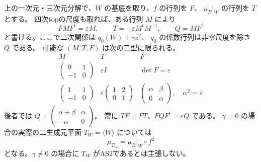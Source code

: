 \begin{proposition}[共通二平面上の中山作用の二標準形]
\label{prop:h3-order2-plane-matrices}
上の一次元・三次元分解で、$W$ の基底を取り、$f$ の行列を $F$、
$\mu_B|_W$ の行列を $T$ とする。
四次topの尺度も取れば、ある行列 $M$ により
\[
 FMF^t=\varepsilon M,\qquad
 T=-\varepsilon M^tM^{-1},\qquad
 Q=MF^t
\]
と書ける。ここで二次関係は $q_0(W)+\gamma z^2$、
$q_0$ の係数行列は非零尺度を除き $Q$ である。
可能な $(M,T,F)$ は次の二型に限られる。
\[
\begin{array}{c|c|c}
M&T&F\\\hline
\begin{pmatrix}0&1\\-1&0\end{pmatrix}
 &\varepsilon I&\det F=\varepsilon\\[2pt]
\begin{pmatrix}1&1\\-1&0\end{pmatrix}
 &\varepsilon\begin{pmatrix}1&2\\0&1\end{pmatrix}
 &\begin{pmatrix}\alpha&\beta\\0&\alpha\end{pmatrix},\quad
   \alpha^2=\varepsilon
\end{array}
\]
後者では $Q=\begin{pmatrix}\alpha+\beta&\alpha\\-\alpha&0\end{pmatrix}$。
常に $TF=FT$、$FQF^t=\varepsilon Q$ である。
$\gamma=0$ の場合の実際の二生成元平面 $T_W=\langle W\rangle$ については
\[
 \mu_{T_W}=\mu_B|_W\circ f^2
\]
となる。$\gamma\ne0$ の場合に $T_W$ がAS2であるとは主張しない。
\end{proposition}
